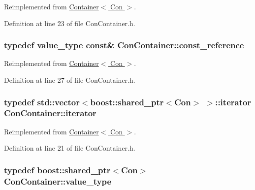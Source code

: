 Reimplemented from \hyperlink{class_container_a5eabadaffdd508cb623c955eb0af1518}{Container$<$ Con $>$}.



Definition at line 23 of file ConContainer.h.

\hypertarget{class_con_container_ac644eca2f5ee432a6070fd1d397b3741}{
\subsubsection[{const\_\-reference}]{\setlength{\rightskip}{0pt plus 5cm}typedef {\bf value\_\-type} const\& {\bf ConContainer::const\_\-reference}}}
\label{class_con_container_ac644eca2f5ee432a6070fd1d397b3741}


Reimplemented from \hyperlink{class_container_a9aaab0502055ee85ce5d3633fbca2675}{Container$<$ Con $>$}.



Definition at line 27 of file ConContainer.h.

\hypertarget{class_con_container_a5dc8aab66a22fc25b7e700b51265b577}{
\subsubsection[{iterator}]{\setlength{\rightskip}{0pt plus 5cm}typedef std::vector$<$boost::shared\_\-ptr$<${\bf Con}$>$ $>$::{\bf iterator} {\bf ConContainer::iterator}}}
\label{class_con_container_a5dc8aab66a22fc25b7e700b51265b577}


Reimplemented from \hyperlink{class_container_afe880028d8304353129f47cd1d28c20a}{Container$<$ Con $>$}.



Definition at line 21 of file ConContainer.h.

\hypertarget{class_con_container_a08881a149e3a285eba67a4c8cff92a9e}{
\subsubsection[{value\_\-type}]{\setlength{\rightskip}{0pt plus 5cm}typedef boost::shared\_\-ptr$<${\bf Con}$>$ {\bf ConContainer::value\_\-type}}}
\label{class_con_container_a08881a149e3a285eba67a4c8cff92a9e}


